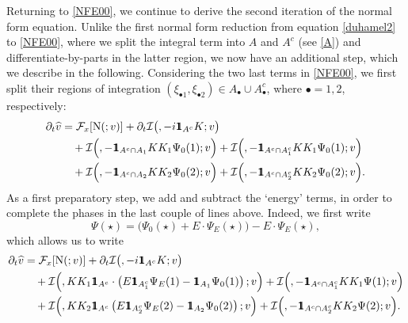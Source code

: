 \documentclass[a4paper,
11pt,  reqno]{amsart}
\makeatletter
\newcommand{\mathbbm}[1]{\mathchoice%
    {\hbox{\sffamily 1\kern-.40em 1}}%
    {\hbox{\sffamily 1\kern-.40em 1}}%
    {\hbox{\scriptsize\sffamily 1\kern-.30em 1}}%
    {\hbox{\tiny\sffamily 1\kern-.25em 1}}}%
\newcommand{\5}{\textup{V}}
\newcommand{\ft}{\widehat}
\newcommand{\ind}{\mathbbm 1}
\newcommand{\dt}{\partial_t}
\theoremstyle{remark}
\newcommand{\bul}{\bullet}
\newcommand{\Ft}{{\mathcal{F}}}
\def\<#1>{\csname MH@symb@#1\endcsname}
\newcommand{\Ical}{\mathcal{I}}
\numberwithin{equation}{section}
\numberwithin{theorem}{section}
\newcommand{\NN}{\mathrm{N}}
\providecommand{\DIFaddbegin}{} %
\providecommand{\DIFaddend}{} %
\providecommand{\DIFdelbegin}{} %
\providecommand{\DIFdelend}{} %
\makeatother
\begin{document}
Returning to \eqref{NFE00}, we continue to derive the second iteration of the normal form equation.
Unlike the first normal form reduction from equation \eqref{duhamel2} to \eqref{NFE00}, where we split the integral term into $A$ and $A^c$ (see \eqref{A}) and differentiate-by-parts in the latter region, we now have an additional step, which we describe in the following. Considering the two last terms in \eqref{NFE00}, we first split their regions of integration $(\xi_{\bul1}, \xi_{\bul2}) \in A_\bul \cup A_\bul^c$, where $\bul = 1,2$, respectively:
\DIFdelbegin %
\DIFdelend \DIFaddbegin \begin{align}
\label{NFE001b}
\dt\ft v
&
= 
 \Ft_x[ \NN ( \<1>; v )]  
+ 
\dt \Ical \big( \<1>, -i  \ind_{A^c} K; v \big)
\\
&
\quad 
+
\Ical \Big( \<21>, - \ind_{A^c \cap A_1} KK_1\Psi_0(1) ; v  \Big)  
+
\Ical \Big( \<21>, - \ind_{A^c \cap A_1^c} KK_1\Psi_0(1) ; v  \Big) 
\\
&
\quad 
+
\Ical \Big( \<22>, - \ind_{A^c \cap A_2} KK_2\Psi_0(2) ; v  \Big) 
+
\Ical \Big( \<22>, - \ind_{A^c \cap A_2^c} KK_2\Psi_0(2) ; v  \Big) .
\end{align}\DIFaddend 
As a first preparatory step, we add and subtract the `energy' terms, in order to complete the phases in the last couple of lines above. Indeed, we first write 
\[
\Psi(\star) = \big( \Psi_0(\star) + E \cdot \Psi_E (\star) \big) - E \cdot \Psi_E(\star),
\]
which allows us to write 
\begin{align}
\label{NFE0011}
\dt\ft v
&
= 
 \Ft_x[ \NN ( \<1>; v )]  
+ 
\dt \Ical \big( \<1>, -i  \ind_{A^c} K; v \big)
\\
&
\quad 
+
\Ical \Big( \<21>, K K_1 \ind_{A^c} \cdot \left( E \ind_{A_1^c}  \Psi_E(1) - \ind_{A_1} \Psi_0(1) \right) ; v  \Big)  
+
\Ical \Big( \<21>, - \ind_{A^c \cap A_1^c} KK_1\Psi(1) ; v  \Big) 
\\
&
\quad 
+
\Ical \Big( \<22>, KK_2 \ind_{A^c} \left( E \ind_{A_2^c} \Psi_E(2) - \ind_{A_2} \Psi_0(2)\right) ; v  \Big) 
+
\Ical \Big( \<22>, - \ind_{A^c \cap A_2^c} KK_2\Psi(2) ; v  \Big). 
\end{align}
\end{document}
